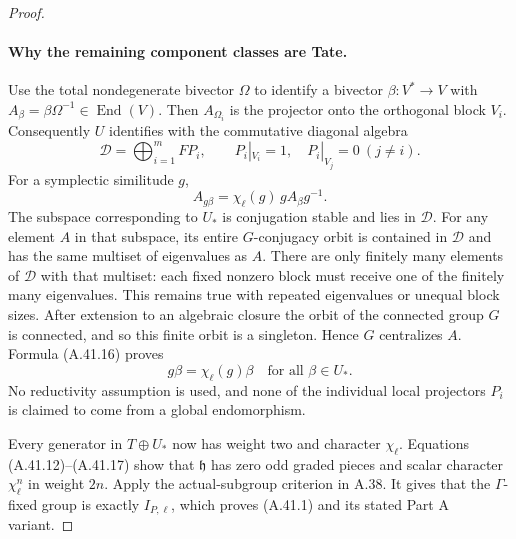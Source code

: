 \begin{proof}
\paragraph{Why the remaining component classes are Tate.}
Use the total nondegenerate bivector \(\Omega\) to
identify a bivector \(\beta:V^*\to V\) with
\(A_\beta=\beta\Omega^{-1}\in\operatorname{End}(V)\).
Then \(A_{\Omega_i}\) is the projector onto the
orthogonal block \(V_i\). Consequently \(U\)
identifies with the commutative diagonal algebra
\[
                 \mathcal D=\bigoplus_{i=1}^mF P_i,
          \qquad P_i|_{V_i}=1,\quad P_i|_{V_j}=0\ (j\ne i).
                                                               \tag{A.41.15}
\]
For a symplectic similitude \(g\),
\[
               A_{g\beta}=\chi_\ell(g)\,gA_\beta g^{-1}.
                                                               \tag{A.41.16}
\]
The subspace corresponding to \(U_*\) is conjugation
stable and lies in \(\mathcal D\). For any element
\(A\) in that subspace, its entire \(G\)-conjugacy
orbit is contained in \(\mathcal D\) and has the
same multiset of eigenvalues as \(A\). There are
only finitely many elements of \(\mathcal D\) with
that multiset: each fixed nonzero block must receive
one of the finitely many eigenvalues. This remains
true with repeated eigenvalues or unequal block sizes.
After extension to an algebraic closure the orbit of
the connected group \(G\) is connected, and so this
finite orbit is a singleton. Hence \(G\) centralizes
\(A\). Formula (A.41.16) proves
\[
                         g\beta=\chi_\ell(g)\beta
                      \quad\text{for all }\beta\in U_*.
                                                               \tag{A.41.17}
\]
No reductivity assumption is used, and none of the
individual local projectors \(P_i\) is claimed to
come from a global endomorphism.

Every generator in \(T\oplus U_*\) now has weight
two and character \(\chi_\ell\). Equations
(A.41.12)--(A.41.17) show that \(\mathfrak h\) has
zero odd graded pieces and scalar character
\(\chi_\ell^n\) in weight \(2n\). Apply the
actual-subgroup criterion in A.38. It gives that the
\(\Gamma\)-fixed group is exactly \(I_{P,\ell}\),
which proves (A.41.1) and its stated Part A variant.


\end{proof}
